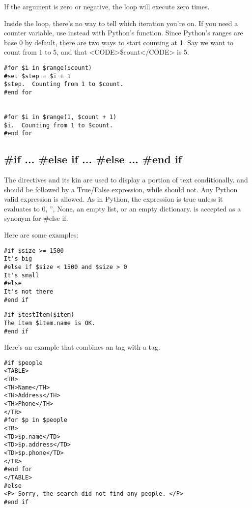 If the argument is zero or negative, the loop will execute zero times.

Inside the loop, there's no way to tell which iteration you're on.  If you
need a counter variable, use  instead with Python's 
function.  Since Python's ranges are base 0 by default, there are two ways
to start counting at 1.  Say we want to count from 1 to 5, and that
<CODE>\$count</CODE> is 5.
\begin{verbatim}
#for $i in $range($count)
#set $step = $i + 1
$step.  Counting from 1 to $count.
#end for


#for $i in $range(1, $count + 1)
$i.  Counting from 1 to $count.
#end for
\end{verbatim}


\subsection{\#if ... \#else if ... \#else ... \#end if}
\label{flowControl.if}

The  directives and its kin are used to display a portion of text
conditionally.  and  should be followed by a
True/False expression, while  should not.  Any Python valid
expression is allowed.  As in Python, the expression is true unless it evaluates
to 0, '', None, an empty list, or an empty dictionary.  is accepted
as a synonym for {\#else if}.

Here are some examples:
\begin{verbatim}
#if $size >= 1500
It's big
#else if $size < 1500 and $size > 0 
It's small
#else
It's not there
#end if
\end{verbatim}

\begin{verbatim}
#if $testItem($item)
The item $item.name is OK.
#end if
\end{verbatim}

Here's an example that combines an  tag with a  tag.
\begin{verbatim}
#if $people
<TABLE>
<TR>
<TH>Name</TH>
<TH>Address</TH>
<TH>Phone</TH>
</TR>
#for $p in $people
<TR>
<TD>$p.name</TD>
<TD>$p.address</TD>
<TD>$p.phone</TD>
</TR>
#end for
</TABLE>
#else
<P> Sorry, the search did not find any people. </P>
#end if
\end{verbatim}



